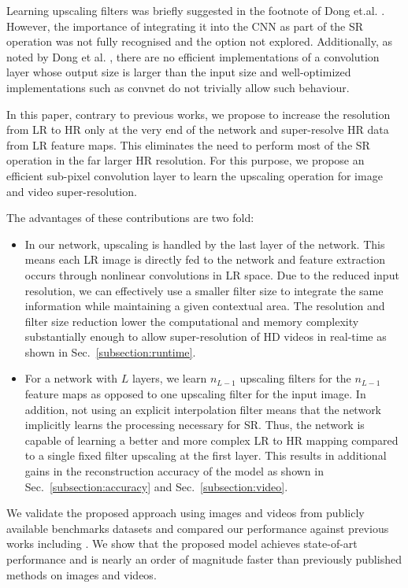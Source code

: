 \documentclass[10pt,twocolumn,letterpaper]{article}
\begin{document}
Learning upscaling filters was briefly suggested in the footnote of Dong et.al. \cite{dong2014learning}. However, the importance of integrating it into the CNN as part of the SR operation was not fully recognised and the option not explored. Additionally, as noted by Dong et al. \cite{dong2014learning}, there are no efficient implementations of a convolution layer whose output size is larger than the input size and well-optimized implementations such as convnet \cite{krizhevsky2012imagenet} do not trivially allow such behaviour.

In this paper, contrary to previous works, we propose to increase the resolution from \ac{LR} to \ac{HR} only at the very end of the network and  super-resolve \ac{HR} data from \ac{LR} feature maps. This eliminates the need to perform most of the \ac{SR} operation in the far larger \ac{HR} resolution. For this purpose, we propose an efficient sub-pixel convolution layer to learn the upscaling operation for image and video super-resolution.

The advantages of these contributions are two fold:
\begin{itemize}
  \item In our network, upscaling is handled by the last layer of the network. This means each \ac{LR} image is directly fed to the network and feature extraction occurs through nonlinear convolutions in \ac{LR} space. Due to the reduced input resolution, we can effectively use a smaller filter size to integrate the same information while maintaining a given contextual area. The resolution and filter size reduction lower the computational and memory complexity substantially enough to allow super-resolution of \ac{HD} videos in real-time as shown in Sec.~\ref{subsection:runtime}.
  \item For a network with $L$ layers, we learn $n_{L-1}$ upscaling filters for the $n_{L-1}$ feature maps as opposed to one upscaling filter for the input image. In addition, not using an explicit interpolation filter means that the network implicitly learns the processing necessary for \ac{SR}. Thus, the network is capable of learning a better and more complex \ac{LR} to \ac{HR} mapping compared to a single fixed filter upscaling at the first layer. This results in additional gains in the reconstruction accuracy of the model as shown in Sec.~\ref{subsection:accuracy} and Sec.~\ref{subsection:video}.
\end{itemize}

We validate the proposed approach using images and videos from publicly available benchmarks datasets and compared our performance against previous works including \cite{dong2015image,chen2015trainable,schulter2015fast}. We show that the proposed model achieves state-of-art performance and is nearly an order of magnitude faster than previously published methods on images and videos.
\end{document}
